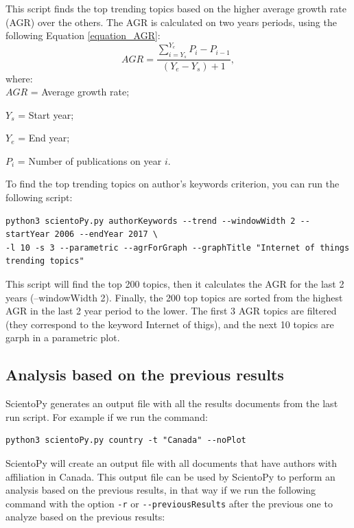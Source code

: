 \documentclass[10pt,letterpaper]{article}
\begin{document}
This script finds the top trending topics based on the higher average growth rate (AGR) over the others. The AGR is calculated on two years periods, using the following Equation \eqref{equation_AGR}:
\begin{equation}
AGR = \frac{\sum\limits_{i = Y_s}^{Y_e}P_i - P_{i-1}}{(Y_e - Y_s)+1},  
\label{equation_AGR}
\end{equation}
where:\\
$AGR$ = Average growth rate;
	
	$Y_s$ = Start year;
	
	$Y_e$ = End year;
	
	$P_i$ = Number of publications on year $i.$
\newline


To find the top trending topics on author's keywords criterion, you can run the following script: 

\begin{verbatim}
python3 scientoPy.py authorKeywords --trend --windowWidth 2 --startYear 2006 --endYear 2017 \
-l 10 -s 3 --parametric --agrForGraph --graphTitle "Internet of things trending topics"
\end{verbatim}

This script will find the top 200 topics, then it calculates the AGR for the last 2 years (--windowWidth 2). Finally, the 200 top topics are sorted from the highest AGR in the last 2 year period to the lower. The first 3 AGR topics are filtered (they correspond to the keyword Internet of thigs), and the next 10 topics are garph in a parametric plot. 

\subsection{Analysis based on the previous results}

ScientoPy generates an output file with all the results documents from the last run script. For example if we run the command:

\begin{verbatim}
python3 scientoPy.py country -t "Canada" --noPlot
\end{verbatim}

ScientoPy will create an output file with all documents that have authors with affiliation in Canada. This output file can be used by ScientoPy to perform an analysis based on the previous results, in that way if we run the following command with the option  \verb|-r| or \verb|--previousResults| after the previous one to analyze based on the previous results:
\end{document}
